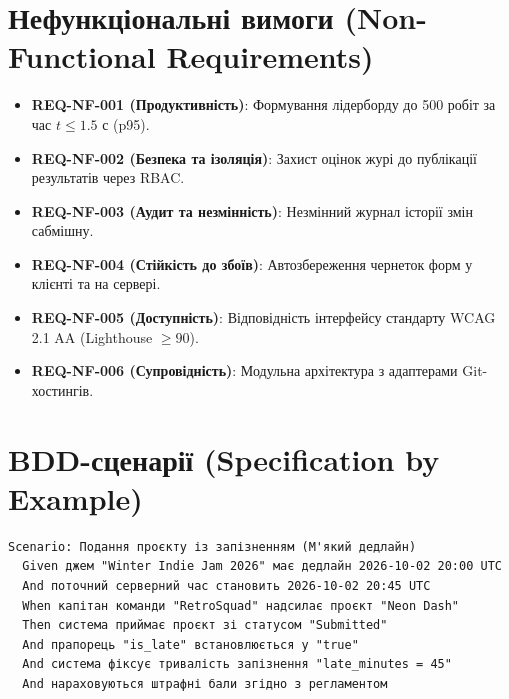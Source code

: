 \documentclass[12pt,a4paper]{article}
\begin{document}
\section{Нефункціональні вимоги (Non-Functional Requirements)}
\begin{itemize}
    \item \textbf{REQ-NF-001 (Продуктивність)}: Формування лідерборду до 500 робіт за час $t \le 1.5$ с (p95).
    \item \textbf{REQ-NF-002 (Безпека та ізоляція)}: Захист оцінок журі до публікації результатів через RBAC.
    \item \textbf{REQ-NF-003 (Аудит та незмінність)}: Незмінний журнал історії змін сабмішну.
    \item \textbf{REQ-NF-004 (Стійкість до збоїв)}: Автозбереження чернеток форм у клієнті та на сервері.
    \item \textbf{REQ-NF-005 (Доступність)}: Відповідність інтерфейсу стандарту WCAG 2.1 AA (Lighthouse $\ge 90$).
    \item \textbf{REQ-NF-006 (Супровідність)}: Модульна архітектура з адаптерами Git-хостингів.
\end{itemize}

\section{BDD-сценарії (Specification by Example)}
\begin{verbatim}
Scenario: Подання проєкту із запізненням (М'який дедлайн)
  Given джем "Winter Indie Jam 2026" має дедлайн 2026-10-02 20:00 UTC
  And поточний серверний час становить 2026-10-02 20:45 UTC
  When капітан команди "RetroSquad" надсилає проєкт "Neon Dash"
  Then система приймає проєкт зі статусом "Submitted"
  And прапорець "is_late" встановлюється у "true"
  And система фіксує тривалість запізнення "late_minutes = 45"
  And нараховуються штрафні бали згідно з регламентом
\end{verbatim}
\end{document}
